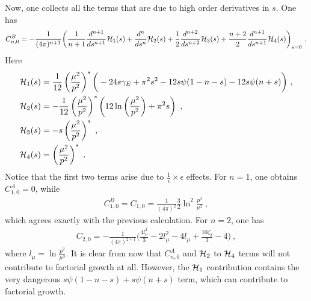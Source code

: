 \documentclass[a4paper,11pt]{article}
\begin{document}
Now, one collects all the terms that are due to high order derivatives in $s$. One has
\begin{align}
C_{n,0}^B=-\frac{1}{(4\pi)^{n+1}}\bigg(\frac{1}{n+1}\frac{d^{n+1}}{ds^{n+1}}{\cal H}_1(s)+\frac{d^n}{ds^n}{\cal H}_2(s)+\frac{1}{2}\frac{d^{n+2}}{ds^{n+2}}{\cal H}_3(s)+\frac{n+2}{2}\frac{d^{n+1}}{ds^{n+1}}{\cal H}_4(s)\bigg)_{s=0} \ .
\end{align}
Here
\begin{align}
&{\cal H}_1(s)=\frac{1}{12}\left(\frac{\mu^2}{p^2}\right)^s\bigg(-24s\gamma_E+\pi^2s^2-12s\psi(1-n-s)-12s\psi(n+s)\bigg) \ , \\
&{\cal H}_2(s)=-\frac{1}{12} \left(\frac{\mu^2}{p^2}\right)^s \left(12 \ln \left(\frac{\mu^2}{p^2}\right)+\pi ^2 s\right) \ , \\
&{\cal H}_3(s)=-s\left(\frac{\mu^2}{p^2}\right)^s \ , \\
&{\cal H}_4(s)=\left(\frac{\mu^2}{p^2}\right)^s \ .
\end{align}
Notice that the first two terms arise due to $\frac{1}{\epsilon} \times \epsilon$ effects. For $n=1$, one obtains $C_{1,0}^A=0$, while
\begin{align}
C_{1,0}^B=C_{1,0}=\frac{1}{(4\pi)^2 }\frac{3}{2}\ln^2\frac{p^2}{\mu^2} \ ,
\end{align}
which agrees exactly with the previous calculation. For $n=2$, one has 
\begin{align}
C_{2,0}=-\frac{1}{(4\pi)^{2+1}}\bigg(\frac{4 l_{\mu}^3}{3}-2 l_{\mu}^2-4l_{\mu}+\frac{10 \zeta_3}{3}-4\bigg) \ ,
\end{align}
where $l_{\mu}=\ln \frac{p^2}{\mu^2}$. It is clear from now that $C_{n,0}^A$ and ${\cal H}_2$ to ${\cal H}_4$ terms will not contribute to factorial growth at all. However, the ${\cal H}_1$ contribution contains the very dangerous $s\psi(1-n-s)+s\psi(n+s)$ term, which can contribute to factorial growth.
\end{document}
